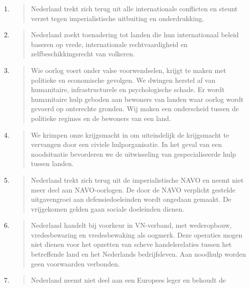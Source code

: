 \begin{enumerate}
\def\labelenumi{\arabic{enumi}.}
\item
  \begin{quote}
  Nederland trekt zich terug uit alle internationale conflicten en
  steunt verzet tegen imperialistische uitbuiting en onderdrukking.
  \end{quote}
\item
  \begin{quote}
  Nederland zoekt toenadering tot landen die hun internationaal beleid
  baseren op vrede, internationale rechtvaardigheid en
  zelfbeschikkingsrecht van volkeren.
  \end{quote}
\item
  \begin{quote}
  Wie oorlog voert onder valse voorwendselen, krijgt te maken met
  politieke en economische gevolgen. We dwingen herstel af van
  humanitaire, infrastructurele en psychologische schade. Er wordt
  humanitaire hulp geboden aan bewoners van landen waar oorlog wordt
  gevoerd op onterechte gronden. Wij maken een onderscheid tussen de
  politieke regimes en de bewoners van een land.
  \end{quote}
\item
  \begin{quote}
  We krimpen onze krijgsmacht in om uiteindelijk de krijgsmacht te
  vervangen door een civiele hulporganisatie. In het geval van een
  noodsituatie bevorderen we de uitwisseling van gespecialiseerde hulp
  tussen landen.
  \end{quote}
\item
  \begin{quote}
  Nederland trekt zich terug uit de imperialistische NAVO en neemt niet
  meer deel aan NAVO-oorlogen. De door de NAVO verplicht gestelde
  uitgavengroei aan defensiedoeleinden wordt ongedaan gemaakt. De
  vrijgekomen gelden gaan sociale doeleinden dienen.
  \end{quote}
\item
  \begin{quote}
  Nederland handelt bij voorkeur in VN-verband, met wederopbouw,
  vredesbewaring en vredesbewaking als oogmerk. Deze operaties mogen
  niet dienen voor het opzetten van scheve handelsrelaties tussen het
  betreffende land en het Nederlands bedrijfsleven. Aan noodhulp worden
  geen voorwaarden verbonden.
  \end{quote}
\item
  \begin{quote}
  Nederland neemt niet deel aan een Europees leger en behoudt de

\end{quote}
\end{enumerate}
